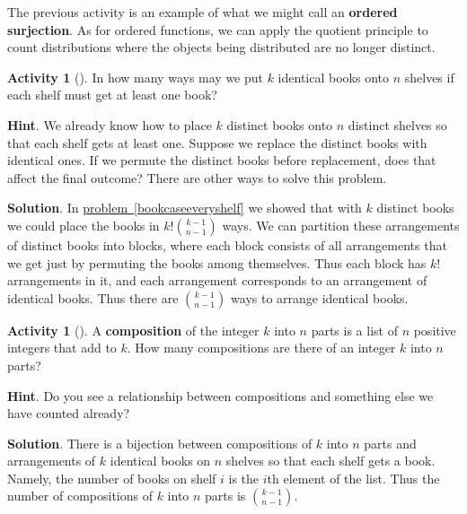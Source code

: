 \documentclass[10pt,]{book}
\newcommand{\terminology}[1]{\textbf{#1}}
\theoremstyle{plain}
\theoremstyle{definition}
\theoremstyle{definition}
\theoremstyle{definition}
\newtheorem{activity}[project]{Activity}
\theoremstyle{definition}
\numberwithin{equation}{chapter}
\begin{document}
The previous activity is an example of what we might call an \terminology{ordered surjection}.  As for ordered functions, we can apply the quotient principle to count distributions where the objects being distributed are no longer distinct.%
\begin{activity}[]\label{activity-70}
\hypertarget{p-765}{}%
In how many ways may we put \(k\) identical books onto \(n\) shelves if each shelf must get at least one book?%
\par\smallskip%
\noindent\textbf{Hint}.\hypertarget{hint-62}{}\quad%
\hypertarget{p-766}{}%
We already know how to place \(k\) distinct books onto \(n\) distinct shelves so that each shelf gets at least one. Suppose we replace the distinct books with identical ones. If we permute the distinct books before replacement, does that affect the final outcome? There are other ways to solve this problem.%
\par\smallskip%
\noindent\textbf{Solution}.\hypertarget{solution-71}{}\quad%
\hypertarget{p-767}{}%
In \hyperref[bookcaseeveryshelf]{problem~\ref{bookcaseeveryshelf}} we showed that with \(k\) distinct books we could place the books in \(k!\binom{k-1}{n-1}\) ways. We can partition these arrangements of distinct books into blocks, where each block consists of all arrangements that we get just by permuting the books among themselves. Thus each block has \(k!\) arrangements in it, and each arrangement corresponds to an arrangement of identical books. Thus there are \(\binom{k-1}{n-1}\) ways to arrange identical books.%
\end{activity}
\begin{activity}[]\label{compositionagian}
\hypertarget{p-768}{}%
A \terminology{composition} of the integer \(k\) into \(n\) parts is a list of \(n\) positive integers that add to \(k\).  How many compositions are there of an integer \(k\) into \(n\) parts?%
\par\smallskip%
\noindent\textbf{Hint}.\hypertarget{hint-63}{}\quad%
\hypertarget{p-769}{}%
Do you see a relationship between compositions and something else we have counted already?%
\par\smallskip%
\noindent\textbf{Solution}.\hypertarget{solution-72}{}\quad%
\hypertarget{p-770}{}%
There is a bijection between compositions of \(k\) into \(n\) parts and arrangements of \(k\) identical books on \(n\) shelves so that each shelf gets a book. Namely, the number of books on shelf \(i\) is the \(i\)th element of the list. Thus the number of compositions of \(k\) into \(n\) parts is \(\binom{k-1}{n-1}\).%
\end{activity}
\end{document}
